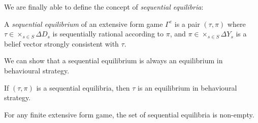 We are finally able to define the concept of \emph{sequential equilibria}:
\begin{definition}
A \emph{sequential equilibrium} of an extensive form game $\Gamma^e$ is a pair $(\tau, \pi)$ where $\tau \in \times_{s \in S} \Delta D_s$ is sequentially rational according to $\pi$, and $\pi \in \times_{s \in S} \Delta Y_s$ is a belief vector strongly consistent with $\tau$.
\label{ch4:def:SeqEq}
\end{definition}

We can show that a sequential equilibrium is always an equilibrium in behavioural strategy.

\begin{theorem}
If $(\tau, \pi)$ is a sequential equilibria, then $\tau$ is an equilibrium in behavioural strategy.
\end{theorem}

\begin{theorem}
For any finite extensive form game, the set of sequential equilibria is non-empty.
\end{theorem}

